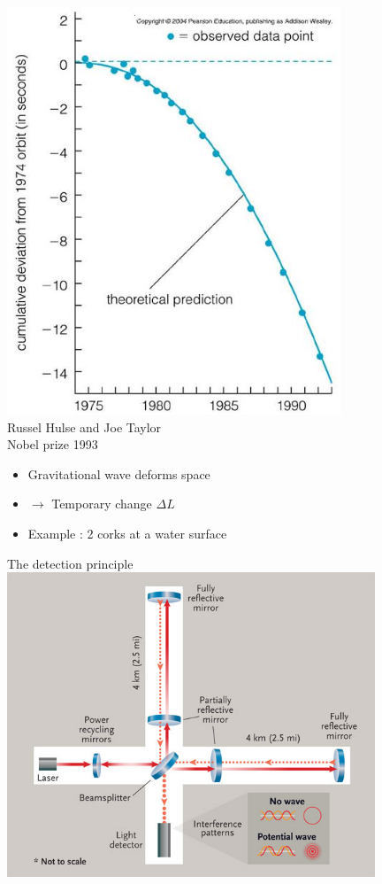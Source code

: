 \newpage

\begin{center}
\includegraphics[keepaspectratio,width=10cm]{Hulse-Taylor-curve}\\[3mm]
{\blue Russel Hulse and Joe Taylor\\
Nobel prize  1993}
\end{center}
\Tr
{}%
\begin{itemize}
\item Gravitational wave deforms space
\item[] $\rightarrow$ Temporary change $\Delta L$
\item Example : 2 corks at a water surface
\end{itemize}
%
\begin{center}
{\blue The detection principle}\\[3mm]
\includegraphics[keepaspectratio,width=11cm]{LIGO-schematic}
\end{center}

